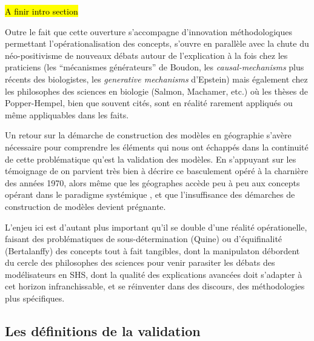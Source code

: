 \hl{ A finir intro section}


Outre le fait que cette ouverture s'accompagne d'innovation méthodologiques permettant l'opérationalisation des concepts, s'ouvre en parallèle avec la chute du néo-positivisme de nouveaux débats autour de l'explication \autocite{Hedstrom2010} à la fois chez les praticiens (les \enquote{mécanismes générateurs} de Boudon, les \textit{causal-mechanisms} plus récents des biologistes, les \textit{generative mechanisms} d'Epstein) mais également chez les philosophes des sciences en biologie (Salmon, Machamer, etc.) où les thèses de Popper-Hempel, bien que souvent cités, sont en réalité rarement appliqués ou même appliquables dans les faits. \autocite{Bechet2013} 

Un retour sur la démarche de construction des modèles en géographie s'avère nécessaire pour comprendre les éléments qui nous ont échappés dans la continuité de cette problématique qu'est la validation des modèles. En s'appuyant sur les témoignage de \autocite{Batty2001, Pumain2003} on parvient très bien à décrire ce basculement opéré à la charnière des années 1970, alors même que les géographes accède peu à peu aux concepts opérant dans le paradigme systémique \autocite{Harvey1969}, et que l'insuffisance des démarches de construction de modèles devient prégnante.

L'enjeu ici est d'autant plus important qu'il se double d'une réalité opérationelle, faisant des problématiques de sous-détermination (Quine) ou d'équifinalité (Bertalanffy) des concepts tout à fait tangibles, dont la manipulaton débordent du cercle des philosophes des sciences pour venir parasiter les débats des modélisateurs en SHS, dont la qualité des explications avancées doit s'adapter à cet horizon infranchissable, et se réinventer dans des discours, des méthodologies plus spécifiques.

\subsection{Les définitions de la validation}
\label{ssec:def_generique_validation}

